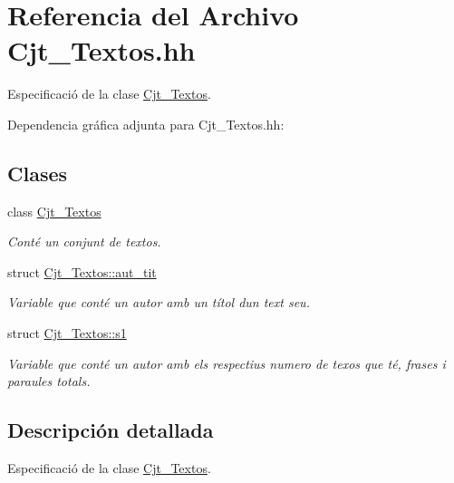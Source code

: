 \hypertarget{_cjt___textos_8hh}{}\section{Referencia del Archivo Cjt\+\_\+\+Textos.\+hh}
\label{_cjt___textos_8hh}


Especificació de la clase \hyperlink{class_cjt___textos}{Cjt\+\_\+\+Textos}.  


Dependencia gráfica adjunta para Cjt\+\_\+\+Textos.\+hh\+:
\subsection*{Clases}
\begin{DoxyCompactItemize}
\item 
class \hyperlink{class_cjt___textos}{Cjt\+\_\+\+Textos}
\begin{DoxyCompactList}\small\item\em Conté un conjunt de textos. \end{DoxyCompactList}\item 
struct \hyperlink{struct_cjt___textos_1_1aut__tit}{Cjt\+\_\+\+Textos\+::aut\+\_\+tit}
\begin{DoxyCompactList}\small\item\em Variable que conté un autor amb un títol d\textquotesingle{}un text seu. \end{DoxyCompactList}\item 
struct \hyperlink{struct_cjt___textos_1_1s1}{Cjt\+\_\+\+Textos\+::s1}
\begin{DoxyCompactList}\small\item\em Variable que conté un autor amb els respectius numero de texos que té, frases i paraules totals. \end{DoxyCompactList}\end{DoxyCompactItemize}


\subsection{Descripción detallada}
Especificació de la clase \hyperlink{class_cjt___textos}{Cjt\+\_\+\+Textos}. 


